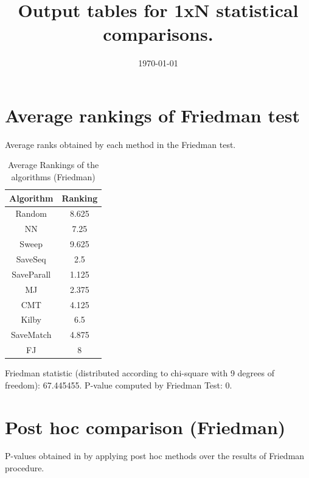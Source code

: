 \documentclass[a4paper,10pt]{article}
\title{Output tables for 1xN statistical comparisons.}
\author{}
\date{\today}
\begin{document}
\begin{landscape}
\pagestyle{empty}
\maketitle
\thispagestyle{empty}

\section{Average rankings of Friedman test}


Average ranks obtained by each method in the Friedman test.

\begin{table}[!htp]
\centering
\begin{tabular}{|c|c|}\hline
Algorithm&Ranking\\\hline
Random&8.625\\NN&7.25\\Sweep&9.625\\SaveSeq&2.5\\SaveParall&1.125\\MJ&2.375\\CMT&4.125\\Kilby&6.5\\SaveMatch&4.875\\FJ&8\\\hline\end{tabular}
\caption{Average Rankings of the algorithms (Friedman)}
\end{table}

Friedman statistic (distributed according to chi-square with 9 degrees of freedom): 67.445455. \newline P-value computed by Friedman Test: 0.\newline


\newpage

\section{Post hoc comparison (Friedman)}


P-values obtained in by applying post hoc methods over the results of Friedman procedure.


\end{landscape}
\end{document}
